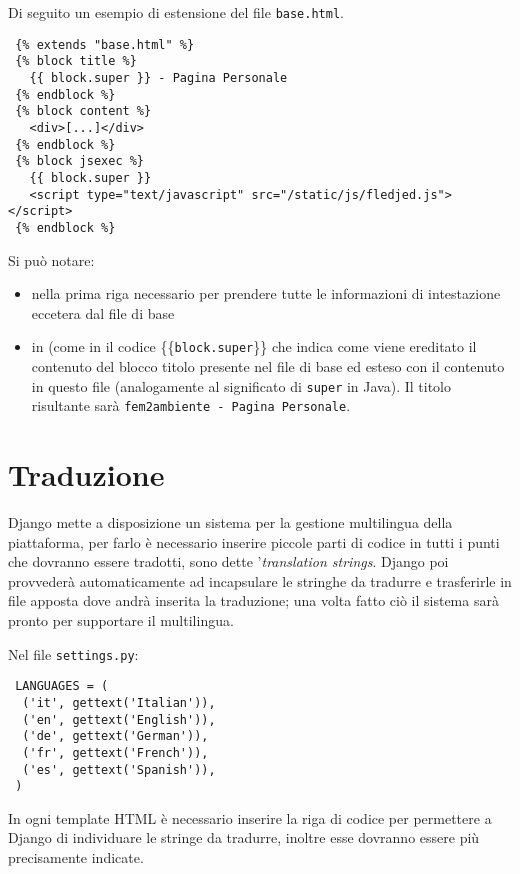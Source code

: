 Di seguito un esempio di estensione del file \texttt{base.html}.

\begin{footnotesize}
\begin{verbatim}
 {% extends "base.html" %}
 {% block title %}
   {{ block.super }} - Pagina Personale
 {% endblock %}
 {% block content %}
   <div>[...]</div>
 {% endblock %}
 {% block jsexec %}
   {{ block.super }}
   <script type="text/javascript" src="/static/js/fledjed.js"></script>
 {% endblock %}
\end{verbatim}
\end{footnotesize}

Si può notare:
\begin{itemize}
 \item nella prima riga  necessario per prendere tutte le informazioni di intestazione eccetera dal file di base
 \item in  (come in  il codice \{\{\texttt{block.super}\}\} che indica come viene ereditato il contenuto del blocco titolo presente nel file di base ed esteso con il contenuto in questo file (analogamente al significato di \texttt{super} in Java). Il titolo risultante sarà \texttt{fem2ambiente - Pagina Personale}.
\end{itemize}


\section*{Traduzione}
\label{app:traduzione}
Django mette a disposizione un sistema per la gestione multilingua della piattaforma, per farlo è necessario inserire piccole parti di codice in tutti i punti che dovranno essere tradotti, sono dette '\emph{translation strings}. Django poi provvederà automaticamente ad incapsulare le stringhe da tradurre e trasferirle in file apposta dove andrà inserita la traduzione; una volta fatto ciò il sistema sarà pronto per supportare il multilingua.

Nel file \texttt{settings.py}:
\begin{footnotesize}
\begin{verbatim}
 LANGUAGES = (
  ('it', gettext('Italian')),
  ('en', gettext('English')),
  ('de', gettext('German')),
  ('fr', gettext('French')),
  ('es', gettext('Spanish')),
 )
\end{verbatim}
\end{footnotesize}

In ogni template HTML è necessario inserire la riga di codice  per permettere a Django di individuare le stringe da tradurre, inoltre esse dovranno essere più precisamente indicate. 


